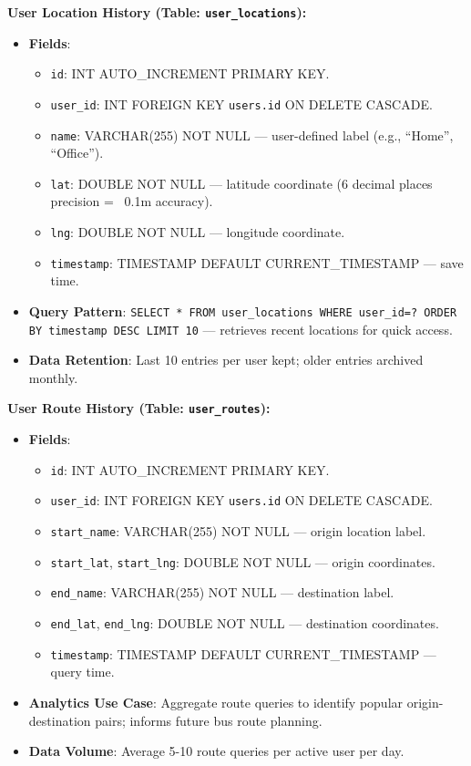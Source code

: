 \textbf{User Location History (Table: \texttt{user\_locations}):}
\begin{itemize}
    \item \textbf{Fields}:
    \begin{itemize}
        \item \texttt{id}: INT AUTO\_INCREMENT PRIMARY KEY.
        \item \texttt{user\_id}: INT FOREIGN KEY \textrightarrow{} \texttt{users.id} ON DELETE CASCADE.
        \item \texttt{name}: VARCHAR(255) NOT NULL — user-defined label (e.g., ``Home'', ``Office'').
        \item \texttt{lat}: DOUBLE NOT NULL — latitude coordinate (6 decimal places precision = ~0.1m accuracy).
        \item \texttt{lng}: DOUBLE NOT NULL — longitude coordinate.
        \item \texttt{timestamp}: TIMESTAMP DEFAULT CURRENT\_TIMESTAMP — save time.
    \end{itemize}
    \item \textbf{Query Pattern}: \texttt{SELECT * FROM user\_locations WHERE user\_id=? ORDER BY timestamp DESC LIMIT 10} — retrieves recent locations for quick access.
    \item \textbf{Data Retention}: Last 10 entries per user kept; older entries archived monthly.
\end{itemize}

\textbf{User Route History (Table: \texttt{user\_routes}):}
\begin{itemize}
    \item \textbf{Fields}:
    \begin{itemize}
        \item \texttt{id}: INT AUTO\_INCREMENT PRIMARY KEY.
        \item \texttt{user\_id}: INT FOREIGN KEY \textrightarrow{} \texttt{users.id} ON DELETE CASCADE.
        \item \texttt{start\_name}: VARCHAR(255) NOT NULL — origin location label.
        \item \texttt{start\_lat}, \texttt{start\_lng}: DOUBLE NOT NULL — origin coordinates.
        \item \texttt{end\_name}: VARCHAR(255) NOT NULL — destination label.
        \item \texttt{end\_lat}, \texttt{end\_lng}: DOUBLE NOT NULL — destination coordinates.
        \item \texttt{timestamp}: TIMESTAMP DEFAULT CURRENT\_TIMESTAMP — query time.
    \end{itemize}
    \item \textbf{Analytics Use Case}: Aggregate route queries to identify popular origin-destination pairs; informs future bus route planning.
    \item \textbf{Data Volume}: Average 5-10 route queries per active user per day.
\end{itemize}

